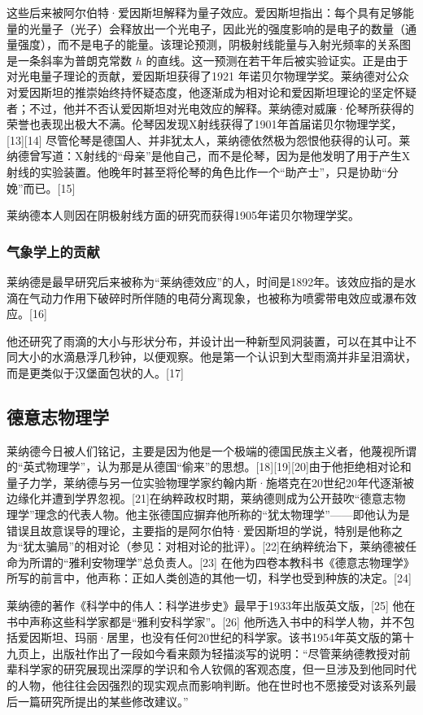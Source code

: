 这些后来被阿尔伯特·爱因斯坦解释为量子效应。爱因斯坦指出：每个具有足够能量的光量子（光子）会释放出一个光电子，因此光的强度影响的是电子的数量（通量强度），而不是电子的能量。该理论预测，阴极射线能量与入射光频率的关系图是一条斜率为普朗克常数 $h$ 的直线。这一预测在若干年后被实验证实。正是由于对光电量子理论的贡献，爱因斯坦获得了1921 年诺贝尔物理学奖。莱纳德对公众对爱因斯坦的推崇始终持怀疑态度，他逐渐成为相对论和爱因斯坦理论的坚定怀疑者；不过，他并不否认爱因斯坦对光电效应的解释。莱纳德对威廉·伦琴所获得的荣誉也表现出极大不满。伦琴因发现X射线获得了1901年首届诺贝尔物理学奖，[13][14] 尽管伦琴是德国人、并非犹太人，莱纳德依然极为怨恨他获得的认可。莱纳德曾写道：X射线的“母亲”是他自己，而不是伦琴，因为是他发明了用于产生X射线的实验装置。他晚年时甚至将伦琴的角色比作一个“助产士”，只是协助“分娩”而已。[15]

莱纳德本人则因在阴极射线方面的研究而获得1905年诺贝尔物理学奖。
\subsubsection{气象学上的贡献}
莱纳德是最早研究后来被称为“莱纳德效应”的人，时间是1892年。该效应指的是水滴在气动力作用下破碎时所伴随的电荷分离现象，也被称为喷雾带电效应或瀑布效应。[16]

他还研究了雨滴的大小与形状分布，并设计出一种新型风洞装置，可以在其中让不同大小的水滴悬浮几秒钟，以便观察。他是第一个认识到大型雨滴并非呈泪滴状，而是更类似于汉堡面包状的人。[17]
\subsection{德意志物理学}
莱纳德今日被人们铭记，主要是因为他是一个极端的德国民族主义者，他蔑视所谓的“英式物理学”，认为那是从德国“偷来”的思想。[18][19][20]由于他拒绝相对论和量子力学，莱纳德与另一位实验物理学家约翰内斯·施塔克在20世纪20年代逐渐被边缘化并遭到学界忽视。[21]在纳粹政权时期，莱纳德则成为公开鼓吹“德意志物理学”理念的代表人物。他主张德国应摒弃他所称的“犹太物理学”——即他认为是错误且故意误导的理论，主要指的是阿尔伯特·爱因斯坦的学说，特别是他称之为“犹太骗局”的相对论（参见：对相对论的批评）。[22]在纳粹统治下，莱纳德被任命为所谓的“雅利安物理学”总负责人。[23] 在他为四卷本教科书《德意志物理学》所写的前言中，他声称：正如人类创造的其他一切，科学也受到种族的决定。[24]

莱纳德的著作《科学中的伟人：科学进步史》最早于1933年出版英文版，[25] 他在书中声称这些科学家都是“雅利安科学家”。[26] 他所选入书中的科学人物，并不包括爱因斯坦、玛丽·居里，也没有任何20世纪的科学家。该书1954年英文版的第十九页上，出版社作出了一段如今看来颇为轻描淡写的说明：“尽管莱纳德教授对前辈科学家的研究展现出深厚的学识和令人钦佩的客观态度，但一旦涉及到他同时代的人物，他往往会因强烈的现实观点而影响判断。他在世时也不愿接受对该系列最后一篇研究所提出的某些修改建议。”

